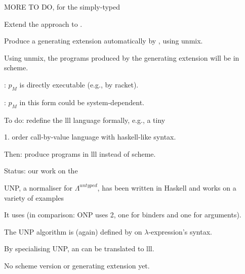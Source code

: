 \documentclass[12pt,fleqn,landscape]{article}
\begin{document}

\begin{slide}{MORE TO DO,  for the simply-typed \lc }

\be

\item Extend the approach to .
\vair

\item Produce a generating extension automatically by ,  using {\sc unmix}. 
\vair

\item Using {\sc unmix}, the programs produced by the generating extension will be  in {\sc scheme}. 

\bi
\item 
{}: $p_M$ is directly executable (e.g., by {\sc racket}).
\vair

\item {}: $p_M$ in this form could be system-dependent. 
\ei
\vair

\item To do: redefine the {\sc lll} language formally, e.g., a tiny

\hfill  1. order call-by-value language with {\sc haskell}-like syntax.
\vair\vair

\item Then: produce programs in  {\sc lll}  instead of {\sc scheme}.

\ee

\end{slide}


\begin{slide}{Status:  our work on the  \lc }

\be

\item UNP, a normaliser for $\Lambda^{untyped}$, has been  written in {\sc Haskell}
and works on a variety of examples
\vair

\item It uses   (in comparison: ONP uses 2, one for binders and one for arguments).
\vair

\item The UNP algorithm  is (again) defined by  on   $\lambda$-expression's syntax.
\vair

\item By specialising UNP, an  can be translated to {\sc lll}.
\vair

\item No {\sc scheme} version or generating extension yet.
\ee

\end{slide}
\end{document}
